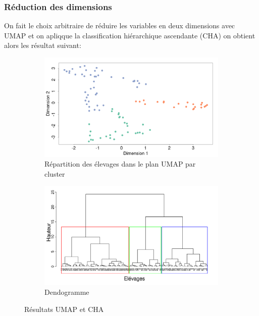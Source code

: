 \documentclass{article}
\begin{document}
\subsubsection{Réduction des dimensions}
On fait le choix arbitraire de réduire les variables en deux dimensions avec UMAP et on apliqque la classification hiérarchique ascendante (CHA) on obtient alors les résultat suivant:

\newpage

\begin{figure}[htbp]
    \centering
    \begin{subfigure}[b]{0.49\textwidth}
        \centering
        \includegraphics[width=\textwidth]{img_var_resp/umap_class_cha.png}
        \caption{Répartition des élevages dans le plan UMAP par cluster}\label{fig:umap_dist_clust}
    \end{subfigure}
    \hspace{0.1cm}
    \begin{subfigure}[b]{0.49\textwidth}
        \centering
        \includegraphics[width=\textwidth]{img_var_resp/dendo_cha.png}
        \caption{Dendogramme}\label{fig:dendo_umap}
    \end{subfigure}
    \caption{Résultats UMAP et CHA}\label{fig:etu_umap}
\end{figure}
\end{document}
